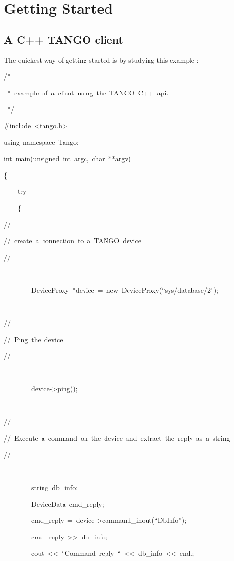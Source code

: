 
\chapter{Getting Started}


\section{A C++ TANGO client}

\noindent The quickest way of getting started is by studying this
example :


\begin{lyxcode}
\noindent /{*}~

\noindent ~{*}~example~of~a~client~using~the~TANGO~C++~api.

\noindent ~{*}/

\noindent \#include~<tango.h>

\noindent using~namespace~Tango;

\noindent int~main(unsigned~int~argc,~char~{*}{*}argv)

\noindent \{

~~~~try

~~~~\{



//

//~create~a~connection~to~a~TANGO~device

//

~

~~~~~~~~DeviceProxy~{*}device~=~new~DeviceProxy(``sys/database/2'');

~

//

//~Ping~the~device

//

~

~~~~~~~~device->ping();

~

//

//~Execute~a~command~on~the~device~and~extract~the~reply~as~a~string

//

~

~~~~~~~~string~db\_info;~

~~~~~~~~DeviceData~cmd\_reply;

~~~~~~~~cmd\_reply~=~device->command\_inout(``DbInfo'');

~~~~~~~~cmd\_reply~>\textcompwordmark{}>~db\_info;

~~~~~~~~cout~<\textcompwordmark{}<~``Command~reply~``~<\textcompwordmark{}<~db\_info~<\textcompwordmark{}<~endl;


\end{lyxcode}

